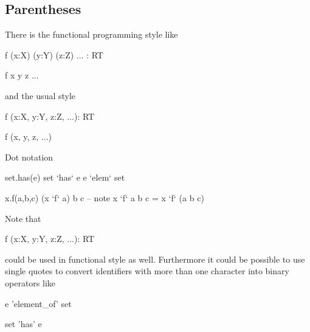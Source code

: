 \subsection{Parentheses}

There is the functional programming style like
%
\begin{alba}
  f (x:X) (y:Y) (z:Z) ... : RT

  f x y z ...
\end{alba}
%
and the usual style
%
\begin{alba}
  f (x:X, y:Y, z:Z, ...): RT

  f (x, y, z, ...)
\end{alba}
%
%
Dot notation
%
\begin{alba}
  set.has(e)                           set `has` e
                                       e `elem` set

  x.f(a,b,c)                           (x `f` a) b c
                                       -- note
                                       x `f` a b c =  x `f` (a b c)
\end{alba}
%
Note that
%
\begin{alba}
  f (x:X, y:Y, z:Z, ...): RT
\end{alba}
%
could be used in functional style as well. Furthermore it could be possible to
use single quotes to convert identifiers with more than one character into
binary operators like
%
\begin{alba}
  e 'element_of' set

  set 'has' e
\end{alba}
%

